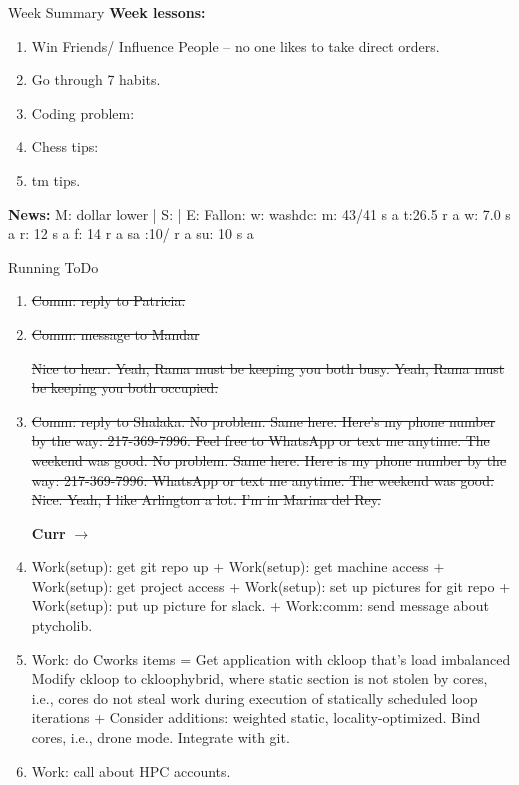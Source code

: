 \documentclass[serif, mathserif, final]{beamer}
\newcommand{\doneTaskNoItemNewLine}[1]{\sout{#1}}
\newcommand{\doneTask}[1]{\tiny \item \tiny \sout{#1}}
\begin{document}
\begin{frame}
\begin{columns}
\begin{column}{0.5\linewidth}
\begin{block}{Week Summary}
    {\tiny {\bf Week lessons:}}
    \begin{enumerate}
      \tiny \item \tiny Win Friends/ Influence People – no one
      likes to take direct orders.
    \item \tiny Go through 7 habits.
    \item \tiny Coding problem: 
    \item \tiny Chess tips: 
    \item \tiny tm tips.
    \end{enumerate}
        {{\tiny {\bf News:}} M: dollar lower | S: 
          | E: Fallon: 
          w: washdc: {m: {43/41 s a}}  t:{26.5 r a} {w: {7.0 s a}} {r:
            {12 s a}} {f: {14 r a}} {sa :{10/ r a} }
          {su: {10 s a  }}}
  \end{block} 

  \begin{block}{Running ToDo} %
    \begin{enumerate} 

    \doneTask{Comm: reply to Patricia. } 
    \doneTask{Comm: message to Mandar} 

    \doneTaskNoItemNewLine{Nice to hear. Yeah, Rama must be keeping 
      you both busy. Yeah, Rama must be keeping you both occupied.}

    \doneTask{Comm: reply to Shalaka.
      No problem. Same here. Here's my phone number by the way:
      217-369-7996. Feel free to WhatsApp or text me anytime.
      The weekend was good. No problem. Same here. Here is my phone number by the way: 217-369-7996. WhatsApp or text me anytime. 
      The weekend was good. Nice. Yeah, I like Arlington a lot. 
      I'm in Marina del Rey.}

    {\bf Curr} $\rightarrow$ \\
    \tiny \item \tiny Work(setup): get git repo up + Work(setup): get
    machine access + Work(setup): get project access + Work(setup):
    set up pictures for git repo + Work(setup): put up picture for
    slack. +  Work:comm: send message about ptycholib.
    
  \item \tiny Work: do Cworks items = Get application with ckloop
    that’s load imbalanced Modify ckloop to ckloophybrid, where
    static section is not stolen by cores, i.e., cores do not steal
    work during execution of statically scheduled loop iterations +
    Consider additions: weighted static, locality-optimized. Bind
    cores, i.e., drone mode. Integrate with git. 
  \item \tiny Work: call about HPC accounts. 


\end{enumerate}
\end{block}
\end{column}
\end{columns}
\end{frame}
\end{document}
